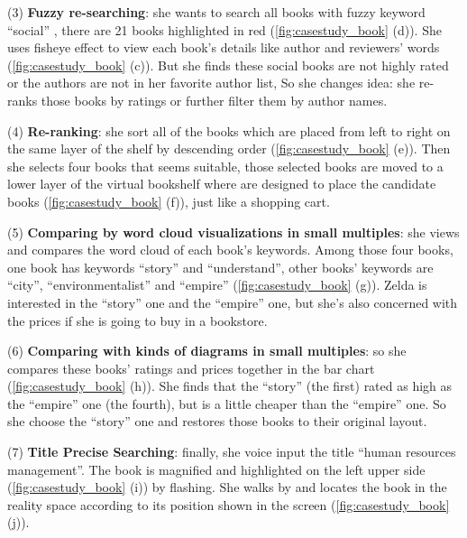(3) \textbf{Fuzzy re-searching}: she wants to search all books with fuzzy keyword ``social'' ,
there are 21 books highlighted in red (\autoref{fig:casestudy_book} (d)).
She uses fisheye effect to view each book's details like author and reviewers' words (\autoref{fig:casestudy_book} (c)).
But she finds these social books are not highly rated or the authors are not in her favorite author list,
So she changes idea: she re-ranks those books by ratings or further filter them by author names.

(4) \textbf{Re-ranking}: she sort all of the books which are placed
from left to right on the same layer of the shelf by descending order (\autoref{fig:casestudy_book} (e)).
Then she selects four books that seems suitable,
those selected books are moved to a lower layer of the
virtual bookshelf where are designed to place the candidate books (\autoref{fig:casestudy_book} (f)),
just like a shopping cart.

(5) \textbf{Comparing by word cloud visualizations in small multiples}:
she views and compares the word cloud of each book's keywords.
Among those four books, one book has keywords ``story'' and ``understand'', other books' keywords are
``city'', ``environmentalist'' and ``empire'' (\autoref{fig:casestudy_book} (g)).
Zelda is interested in the ``story'' one and the ``empire'' one, but she's also concerned with the prices
if she is going to buy in a bookstore.


(6) \textbf{Comparing with kinds of diagrams in small multiples}:
so she compares these books' ratings and prices together
in the bar chart (\autoref{fig:casestudy_book} (h)).
She finds that the ``story'' (the first) rated as high as
the ``empire'' one (the fourth), but is a little cheaper than the ``empire'' one.
So she choose the ``story'' one and restores those books to their original layout.

(7) \textbf{Title Precise Searching}: finally, she voice input the title ``human resources management''.
The book is magnified and highlighted on the left upper side (\autoref{fig:casestudy_book} (i)) by flashing.
She walks by and locates the book in the reality space according to
its position shown in the screen (\autoref{fig:casestudy_book} (j)).





